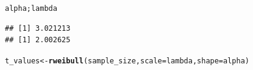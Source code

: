 \documentclass[11pt, a4paper]{article}\usepackage[]{graphicx}\usepackage[]{xcolor}
\makeatletter
\newcommand{\hldef}[1]{\textcolor[rgb]{0.345,0.345,0.345}{#1}}%
\newcommand{\hlkwb}[1]{\textcolor[rgb]{0.69,0.353,0.396}{#1}}%
\newcommand{\hlkwc}[1]{\textcolor[rgb]{0.333,0.667,0.333}{#1}}%
\newcommand{\hlkwd}[1]{\textcolor[rgb]{0.737,0.353,0.396}{\textbf{#1}}}%
\newenvironment{kframe}{%
 \def\at@end@of@kframe{}%
 \ifinner\ifhmode%
  \def\at@end@of@kframe{\end{minipage}}%
  \begin{minipage}{\columnwidth}%
 \fi\fi%
 \def\FrameCommand##1{\hskip\@totalleftmargin \hskip-\fboxsep
 \colorbox{shadecolor}{##1}\hskip-\fboxsep
     \hskip-\linewidth \hskip-\@totalleftmargin \hskip\columnwidth}%
 \MakeFramed {\advance\hsize-\width
   \@totalleftmargin\z@ \linewidth\hsize
   \@setminipage}}%
 {\par\unskip\endMakeFramed%
 \at@end@of@kframe}
\newenvironment{knitrout}{}{} %
\makeatother
\begin{document}
\begin{knitrout}
\color{fgcolor}\begin{kframe}
\begin{alltt}
\hldef{alpha; lambda}
\end{alltt}
\begin{verbatim}
## [1] 3.021213
## [1] 2.002625
\end{verbatim}
\end{kframe}
\end{knitrout}



\newpage

\begin{knitrout}
\color{fgcolor}\begin{kframe}
\begin{alltt}
\hldef{t_values} \hlkwb{<-} \hlkwd{rweibull}\hldef{(sample_size,} \hlkwc{scale} \hldef{= lambda,} \hlkwc{shape} \hldef{= alpha)}
\end{alltt}
\end{kframe}
\end{knitrout}
\end{document}
